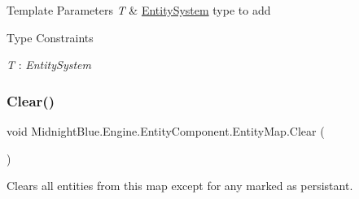 \begin{DoxyTemplParams}{Template Parameters}
{\em T} & \hyperlink{class_midnight_blue_1_1_engine_1_1_entity_component_1_1_entity_system}{Entity\+System} type to add\\
\hline
\end{DoxyTemplParams}
\begin{Desc}
\item[Type Constraints]\begin{description}
\item[{\em T} : {\em Entity\+System}]\end{description}
\end{Desc}
\hypertarget{class_midnight_blue_1_1_engine_1_1_entity_component_1_1_entity_map_af8b2220c70e42cd8e4802b744397ffcf}{}\label{class_midnight_blue_1_1_engine_1_1_entity_component_1_1_entity_map_af8b2220c70e42cd8e4802b744397ffcf} 
\subsubsection{\texorpdfstring{Clear()}{Clear()}}
{\footnotesize\ttfamily void Midnight\+Blue.\+Engine.\+Entity\+Component.\+Entity\+Map.\+Clear (\begin{DoxyParamCaption}{ }\end{DoxyParamCaption})\hspace{0.3cm}{\ttfamily [inline]}}



Clears all entities from this map except for any marked as persistant. 


